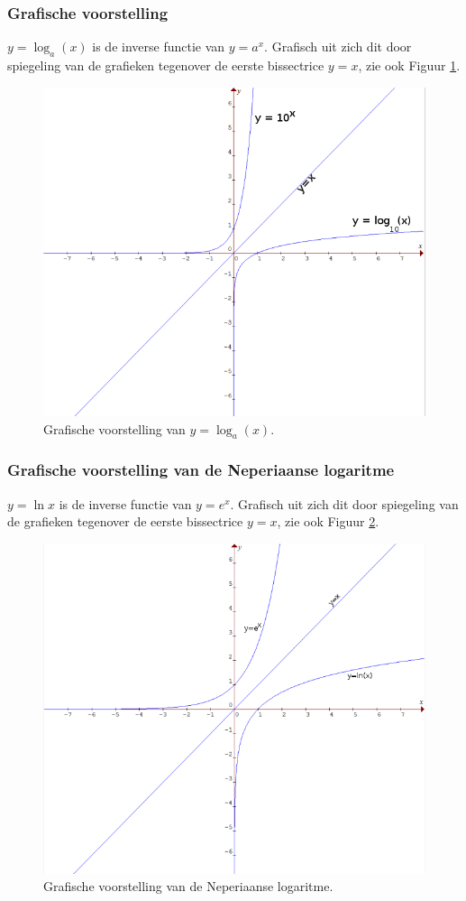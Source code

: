 \subsubsection{Grafische voorstelling}

$y=\log_{a}(x)$ is de inverse functie van $y=a^x$. Grafisch uit zich dit door spiegeling van de grafieken tegenover de eerste bissectrice $y=x$, zie ook Figuur \ref{fig:logfunc1}.

\begin{figure}
	\centering
	\includegraphics[width=0.5\linewidth]{1_elem_rekenvaardigheden_A/inputs/logFunc1}
	\caption{Grafische voorstelling van $y=\log_{a}(x)$.}
	\label{fig:logfunc1}
\end{figure}


\subsubsection{Grafische voorstelling van de Neperiaanse logaritme}

$y=\ln x$ is de inverse functie van $y=e^x$. Grafisch uit zich dit door spiegeling van de grafieken tegenover de eerste bissectrice $y=x$, zie ook Figuur \ref{fig:logfunc2}.

\begin{figure}
	\centering
	\includegraphics[width=0.5\linewidth]{1_elem_rekenvaardigheden_A/inputs/logFunc2}
	\caption{Grafische voorstelling van de Neperiaanse logaritme.}
	\label{fig:logfunc2}
\end{figure}


